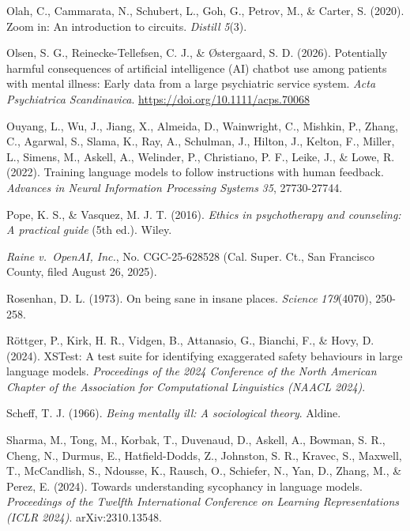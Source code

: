 \documentclass[11pt]{article}
\begin{document}
\hangindent=0.5in  Olah, C., Cammarata, N., Schubert, L., Goh, G., Petrov, M., \& Carter, S. (2020). Zoom in: An introduction to circuits. \emph{Distill} \emph{5}(3).\par
\hangindent=0.5in  Olsen, S. G., Reinecke-Tellefsen, C. J., \& {\O}stergaard, S. D. (2026). Potentially harmful consequences of artificial intelligence (AI) chatbot use among patients with mental illness: Early data from a large psychiatric service system. \emph{Acta Psychiatrica Scandinavica}. \url{https://doi.org/10.1111/acps.70068}\par
\hangindent=0.5in  Ouyang, L., Wu, J., Jiang, X., Almeida, D., Wainwright, C., Mishkin, P., Zhang, C., Agarwal, S., Slama, K., Ray, A., Schulman, J., Hilton, J., Kelton, F., Miller, L., Simens, M., Askell, A., Welinder, P., Christiano, P. F., Leike, J., \& Lowe, R. (2022). Training language models to follow instructions with human feedback. \emph{Advances in Neural Information Processing Systems} \emph{35}, 27730-27744.\par
\hangindent=0.5in  Pope, K. S., \& Vasquez, M. J. T. (2016). \emph{Ethics in psychotherapy and counseling: A practical guide} (5th ed.). Wiley.\par
\hangindent=0.5in  \emph{Raine v.\ OpenAI, Inc.}, No. CGC-25-628528 (Cal. Super. Ct., San Francisco County, filed August 26, 2025).\par
\hangindent=0.5in  Rosenhan, D. L. (1973). On being sane in insane places. \emph{Science} \emph{179}(4070), 250-258.\par
\hangindent=0.5in  R{\"o}ttger, P., Kirk, H. R., Vidgen, B., Attanasio, G., Bianchi, F., \& Hovy, D. (2024). XSTest: A test suite for identifying exaggerated safety behaviours in large language models. \emph{Proceedings of the 2024 Conference of the North American Chapter of the Association for Computational Linguistics (NAACL 2024)}.\par
\hangindent=0.5in  Scheff, T. J. (1966). \emph{Being mentally ill: A sociological theory}. Aldine.\par
\hangindent=0.5in  Sharma, M., Tong, M., Korbak, T., Duvenaud, D., Askell, A., Bowman, S. R., Cheng, N., Durmus, E., Hatfield-Dodds, Z., Johnston, S. R., Kravec, S., Maxwell, T., McCandlish, S., Ndousse, K., Rausch, O., Schiefer, N., Yan, D., Zhang, M., \& Perez, E. (2024). Towards understanding sycophancy in language models. \emph{Proceedings of the Twelfth International Conference on Learning Representations (ICLR 2024)}. arXiv:2310.13548.\par
\end{document}
